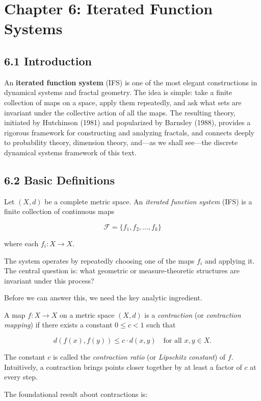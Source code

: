 \chapter{Chapter 6: Iterated Function Systems}

\section{6.1 Introduction}

An \textbf{iterated function system} (IFS) is one of the most elegant constructions in dynamical systems and fractal geometry. The idea is simple: take a finite collection of maps on a space, apply them repeatedly, and ask what sets are invariant under the collective action of all the maps. The resulting theory, initiated by Hutchinson (1981) and popularized by Barnsley (1988), provides a rigorous framework for constructing and analyzing fractals, and connects deeply to probability theory, dimension theory, and—as we shall see—the discrete dynamical systems framework of this text.

\section{6.2 Basic Definitions}

\begin{definition}
Let $(X, d)$ be a complete metric space. An \textit{iterated function system} (IFS) is a finite collection of continuous maps

\[
\mathcal{F} = \{ f_1, f_2, \ldots, f_k\} 
\]

where each $f_i : X \to X$.

The system operates by repeatedly choosing one of the maps $f_i$ and applying it. The central question is: what geometric or measure-theoretic structures are invariant under this process?

Before we can answer this, we need the key analytic ingredient.
\end{definition}

\begin{definition}
A map $f : X \to X$ on a metric space $(X, d)$ is a \textit{contraction} (or \textit{contraction mapping}) if there exists a constant $0 \le c < 1$ such that

\[
d(f(x), f(y)) \le c \cdot d(x, y) \quad \text{for all } x, y \in X.
\]

The constant $c$ is called the \textit{contraction ratio} (or \textit{Lipschitz constant}) of $f$. Intuitively, a contraction brings points closer together by at least a factor of $c$ at every step.

The foundational result about contractions is:
\end{definition}

